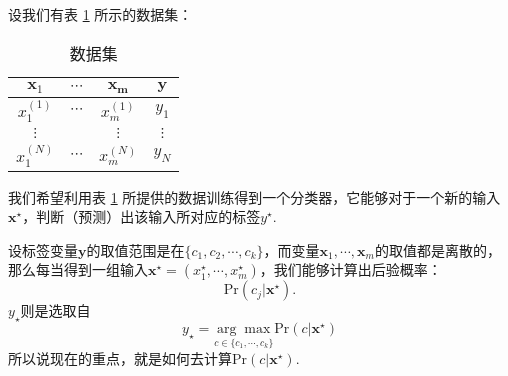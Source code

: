 \documentclass{ctexart}
\newcommand{\pr}{\mathrm{Pr}}
\begin{document}
    设我们有表 \ref{tab:dataset-1} 所示的数据集：
    \begin{table}[H]
        \begin{center}
            \caption{数据集}
            \label{tab:dataset-1}
            \begin{tabular}{cccc}
                \toprule
                $\boldsymbol{x}_1$ & $\cdots$ & $\boldsymbol{x_m}$ & $\boldsymbol{y}$ \\
                \midrule
                $x_{1}^{(1)}$ & $\cdots$ & $x_{m}^{(1)}$ & $y_1$ \\
                $\vdots$ & {} & $\vdots$ & $\vdots$ \\
                $x_{1}^{(N)}$ & $\cdots$ & $x_{m}^{(N)}$ & $y_N$ \\
                \bottomrule
            \end{tabular}
        \end{center}
    \end{table}
    我们希望利用表 \ref{tab:dataset-1} 所提供的数据训练得到一个分类器，它能够对于一个新的输入$\boldsymbol{x}^\star$，判断（预测）出该输入所对应的标签$y^\star$.

    设标签变量$\boldsymbol{y}$的取值范围是在$\{ c_1, c_2, \cdots, c_k \}$，而变量$\boldsymbol{x}_1,\cdots,\boldsymbol{x}_m$的取值都是离散的，那么每当得到一组输入$\boldsymbol{x}^\star=(x_1^{\star},\cdots,x_m^\star)$，我们能够计算出后验概率：
    \begin{equation}
        \pr(c_j | \boldsymbol{x}^\star).
    \end{equation}
    $y_\star$则是选取自
    \begin{equation}
        y_\star = \underset{c \in \{c_1,\cdots,c_k\}}{\arg\max} \pr(c|\boldsymbol{x}^\star)
    \end{equation}
    所以说现在的重点，就是如何去计算$\pr(c|\boldsymbol{x}^\star)$.
\end{document}
